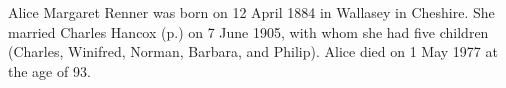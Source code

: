 
Alice Margaret Renner was born on 12 April 1884 in Wallasey in Cheshire.\cite{UKCensus1911_RG14_22074} She married Charles Hancox (p.\pageref{Charles_Edward_Hancox}) on 7 June 1905\cite{UKParishRegisters}, with whom she had five children (Charles, Winifred, Norman, Barbara, and Philip). Alice died on 1 May 1977 at the age of 93.
